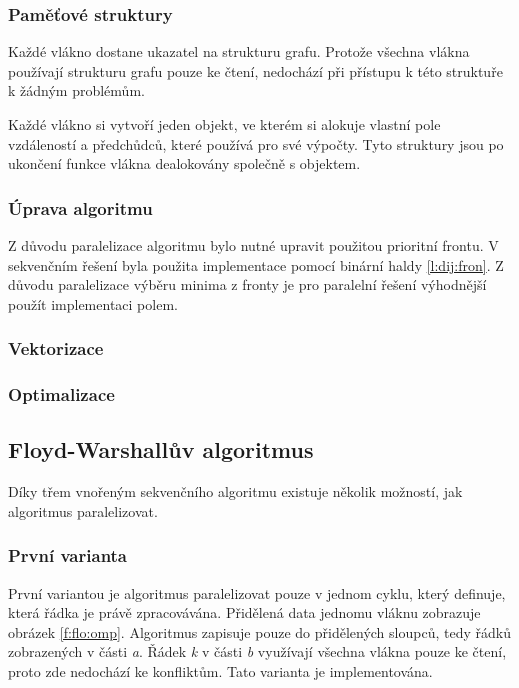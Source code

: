 \subsubsection{Paměťové struktury}
Každé vlákno dostane ukazatel na strukturu grafu. Protože všechna vlákna používají strukturu grafu pouze ke čtení, nedochází při přístupu k této struktuře k žádným problémům.

Každé vlákno si vytvoří jeden objekt, ve kterém si alokuje vlastní pole vzdáleností a předchůdců, které používá pro své výpočty. Tyto struktury jsou po ukončení funkce vlákna dealokovány společně s objektem.

\subsubsection{Úprava algoritmu}
Z důvodu paralelizace algoritmu bylo nutné upravit použitou prioritní frontu. V sekvenčním řešení byla použita implementace pomocí binární haldy \ref{l:dij:fron}. Z důvodu paralelizace výběru minima z fronty je pro paralelní řešení výhodnější použít implementaci polem.


\subsubsection{Vektorizace}


\subsubsection{Optimalizace}


\subsection{Floyd-Warshallův algoritmus}
Díky třem vnořeným sekvenčního algoritmu existuje několik možností, jak algoritmus paralelizovat.

\subsubsection{První varianta}
První variantou je algoritmus paralelizovat pouze v jednom cyklu, který definuje, která řádka je právě zpracovávána. Přidělená data jednomu vláknu zobrazuje obrázek \ref{f:flo:omp}. Algoritmus zapisuje pouze do přidělených sloupců, tedy řádků zobrazených v části \textit{a}. Řádek \textit{k} v části \textit{b} využívají všechna vlákna pouze ke čtení, proto zde nedochází ke konfliktům. Tato varianta je implementována.

